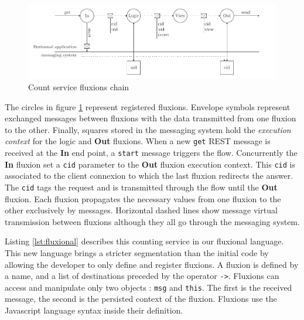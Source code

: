 \begin{figure}[h!]
  \includegraphics[width=\linewidth]{ressources/flux.pdf}
  \caption{Count service fluxions chain}
  \label{fig:fluxions}
\end{figure}

The circles in figure \ref{fig:fluxions} represent registered fluxions.
Envelope symbols represent exchanged messages between fluxions with the data transmitted from one fluxion to the other. Finally, squares stored in the messaging system hold the \textit{execution context} for the logic and \textbf{Out} fluxions.
When a new \texttt{get} REST message is received at the \textbf{In} end point, a \texttt{start} message triggers the flow.
Concurrently the \textbf{In} fluxion set a \texttt{cid} parameter to the \textbf{Out} fluxion execution context.
This \texttt{cid} is associated to the client connexion to which the last fluxion redirects the answer.
The \texttt{cid} tags the request and is transmitted through the flow until the \textbf{Out} fluxion.
Each fluxion propagates the necessary values from one fluxion to the other exclusively by messages.
Horizontal dashed lines show message virtual transmission between fluxions although they all go through the messaging system.

Listing \ref{lst:fluxional} describes this counting service in our fluxional language.
This new language brings a stricter segmentation than the initial code by allowing the developer to only define and register fluxions.
A fluxion is defined by a name, and a list of destinations preceded by the operator \texttt{-}\texttt{>}.
Fluxions can access and manipulate only two objects : \texttt{msg} and \texttt{this}.
The first is the received message, the second is the persisted context of the fluxion.
Fluxions use the Javascript language syntax inside their definition.



